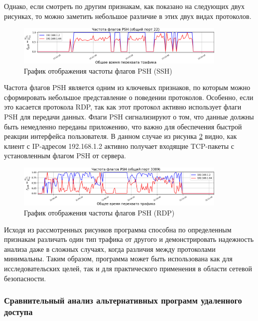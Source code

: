 \documentclass[spec, och, diploma]{SCWorks}
\begin{document}
Однако, если смотреть по другим признакам, как показано на следующих двух рисунках, то можно заметить небольшое различие в этих двух видах протоколов.

\begin{figure}[H]
  \centering
  \includegraphics[width=0.9\textwidth]{pics/newssh2.png}
  \caption{График отображения частоты флагов PSH (SSH)}
  \label{sshg2}
\end{figure}

Частота флагов PSH является одним из ключевых признаков, по которым можно сформировать небольшое представление о поведении протоколов. Особенно, если это касается
протокола RDP, так как этот протокол активно использует флаги PSH для передачи данных. Флаги PSH сигнализируют о том, что данные должны быть немедленно 
переданы приложению, что важно для обеспечения быстрой реакции интерфейса пользователя. В данном случае из рисунка \ref{rdpg2} видно, как клиент с IP-адресом 192.168.1.2
активно получает входящие TCP-пакеты с установленным флагом PSH от сервера.

\begin{figure}[H]
  \centering
  \includegraphics[width=0.9\textwidth]{pics/newrdp2.png}
  \caption{График отображения частоты флагов PSH (RDP)}
  \label{rdpg2}
\end{figure}



Исходя из рассмотренных рисунков программа способна по определенным признакам различать один тип трафика от другого и демонстрировать 
надежность анализа даже в сложных случаях, когда различия между протоколами минимальны. Таким образом, программа может быть использована 
как для исследовательских целей, так и для практического применения в области сетевой безопасности.

\subsubsection{Сравнительный анализ альтернативных программ удаленного доступа}
\end{document}

